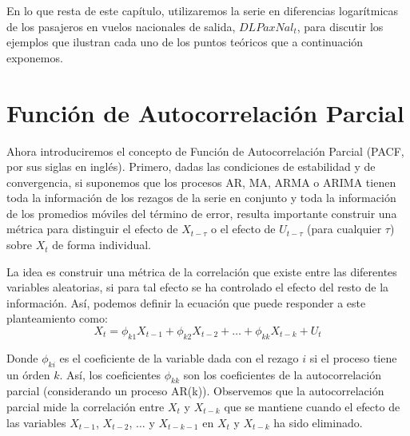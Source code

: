 \documentclass[
]{book}
\begin{document}
En lo que resta de este capítulo, utilizaremos la serie en diferencias logarítmicas de los pasajeros en vuelos nacionales de salida, \(DLPaxNal_t\), para discutir los ejemplos que ilustran cada uno de los puntos teóricos que a continuación exponemos.

\hypertarget{funciuxf3n-de-autocorrelaciuxf3n-parcial}{%
\section{Función de Autocorrelación Parcial}\label{funciuxf3n-de-autocorrelaciuxf3n-parcial}}

Ahora introduciremos el concepto de Función de Autocorrelación Parcial (PACF, por sus siglas en inglés). Primero, dadas las condiciones de estabilidad y de convergencia, si suponemos que los procesos AR, MA, ARMA o ARIMA tienen toda la información de los rezagos de la serie en conjunto y toda la información de los promedios móviles del término de error, resulta importante construir una métrica para distinguir el efecto de \(X_{t - \tau}\) o el efecto de \(U_{t - \tau}\) (para cualquier \(\tau\)) sobre \(X_t\) de forma individual.

La idea es construir una métrica de la correlación que existe entre las diferentes variables aleatorias, si para tal efecto se ha controlado el efecto del resto de la información. Así, podemos definir la ecuación que puede responder a este planteamiento como:
\begin{equation}
    X_t = \phi_{k1} X_{t-1} + \phi_{k2} X_{t-2} + \ldots + \phi_{kk} X_{t-k} + U_t
    \label{eq:PACFEq}
\end{equation}

Donde \(\phi_{ki}\) es el coeficiente de la variable dada con el rezago \(i\) si el proceso tiene un órden \(k\). Así, los coeficientes \(\phi_{kk}\) son los coeficientes de la autocorrelación parcial (considerando un proceso AR(k)). Observemos que la autocorrelación parcial mide la correlación entre \(X_t\) y \(X_{t-k}\) que se mantiene cuando el efecto de las variables \(X_{t-1}\), \(X_{t-2}\), \(\ldots\) y \(X_{t-k-1}\) en \(X_{t}\) y \(X_{t-k}\) ha sido eliminado.
\end{document}
